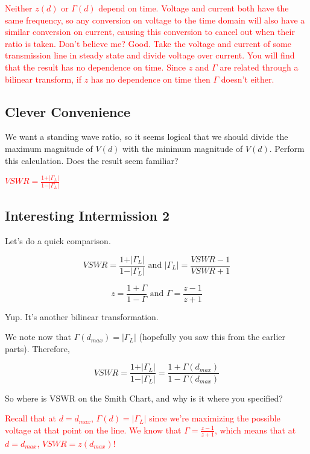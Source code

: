 \documentclass{article}
\begin{document}
\textcolor{red}{Neither $z(d)$ or $\Gamma(d)$ depend on time. Voltage and current both have the same frequency, so any conversion on voltage to the time domain will also have a similar conversion on current, causing this conversion to cancel out when their ratio is taken. Don't believe me? Good. Take the voltage and current of some transmission line in steady state and divide voltage over current. You will find that the result has no dependence on time. Since $z$ and $\Gamma$ are related through a bilinear transform, if $z$ has no dependence on time then $\Gamma$ doesn't either.}

\vfill

\subsection{Clever Convenience}

We want a standing wave ratio, so it seems logical that we should divide the maximum magnitude of $V(d)$ with the minimum magnitude of $V(d)$. Perform this calculation. Does the result seem familiar?
 
\textcolor{red}{$VSWR = \frac{1 + \vert \Gamma_L \vert}{1 - \vert \Gamma_L \vert}$}

\vfill

\subsection{Interesting Intermission 2}

Let's do a quick comparison.

$$VSWR = \frac{1 + \vert \Gamma_L \vert}{1 - \vert \Gamma_L \vert} \text{ and } \vert \Gamma_L \vert = \frac{VSWR - 1}{VSWR + 1}$$

$$z = \frac{1 + \Gamma}{1 - \Gamma} \text{ and } \Gamma = \frac{z - 1}{z + 1}$$

Yup. It's another bilinear transformation.

We note now that $\Gamma(d_{max}) = \vert \Gamma_L \vert$ (hopefully you saw this from the earlier parts). Therefore,

$$VSWR = \frac{1 + \vert \Gamma_L \vert}{1 - \vert \Gamma_L \vert} = \frac{1 + \Gamma(d_{max})}{1 - \Gamma(d_{max})}$$

So where is VSWR on the Smith Chart, and why is it where you specified?

\textcolor{red}{Recall that at $d = d_{max}$, $\Gamma(d) = \vert \Gamma_L \vert$ since we're maximizing the possible voltage at that point on the line. We know that $\Gamma = \frac{z-1}{z+1}$, which means that at $d = d_{max}$, $VSWR = z(d_{max})$!}
\end{document}
